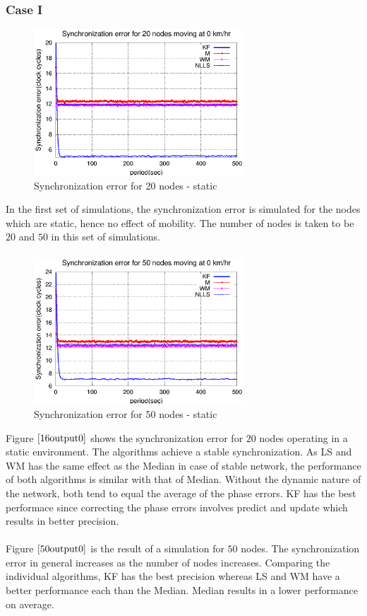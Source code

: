 \documentclass[a4paper,10pt]{report}
\begin{document}
\subsubsection{\textbf{Case I}}
\begin{figure}[!h]
\centering
\includegraphics[width= 0.7\textwidth]{16output-s0}
\caption{Synchronization error for 20 nodes - static} \label{16output0}
\end{figure}
In the first set of simulations, the synchronization error is
simulated for the nodes which are static, hence no effect of
mobility. The number of nodes is taken to be $20$ and $50$ in this
set of simulations.  \paragraph*{}
\begin{figure}
\centering
\includegraphics[width= 0.7\textwidth]{50output-s0}
\caption{Synchronization error for 50 nodes - static} \label{50output0}
\end{figure}
Figure $\ref{16output0}$ shows the synchronization error for $20$
nodes operating in a static environment. The algorithms achieve a
stable synchronization. As LS and WM has the same effect as the
Median in case of stable network, the performance of both algorithms
is similar with that of Median. Without the dynamic nature of the
network, both tend to equal the average of the phase errors. KF has
the best performace since correcting the phase errors involves
predict and update which results in better precision. \paragraph*{}
Figure $\ref{50output0}$ is the result of a simulation for $50$
nodes. The synchronization error in general increases as the number
of nodes increases. Comparing the individual algorithms, KF has the best
precision whereas LS and WM have a better performance
each than the Median. Median results in a lower performance on average.
\end{document}
